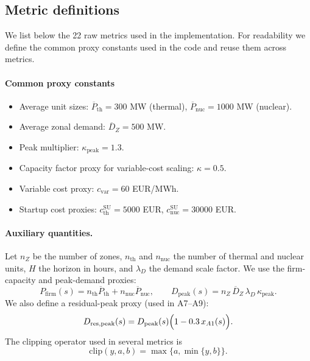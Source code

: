 \documentclass{article}
\begin{document}
\subsection{Metric definitions}
\label{app:crit_metrics}

We list below the 22 raw metrics used in the implementation. For readability we define the common proxy constants used in the code and reuse them across metrics.

\paragraph{Common proxy constants}
\begin{itemize}[noitemsep]
\item Average unit sizes: $\overline{P}_{\mathrm{th}}=300$ MW (thermal), $\overline{P}_{\mathrm{nuc}}=1000$ MW (nuclear).
\item Average zonal demand: $\overline{D}_Z=500$ MW.
\item Peak multiplier: $\kappa_{\mathrm{peak}}=1.3$.
\item Capacity factor proxy for variable-cost scaling: $\kappa=0.5$.
\item Variable cost proxy: $c_{\mathrm{var}}=60$ EUR/MWh.
\item Startup cost proxies: $c^{\mathrm{SU}}_{\mathrm{th}}=5000$ EUR, $c^{\mathrm{SU}}_{\mathrm{nuc}}=30000$ EUR.
\end{itemize}

\paragraph{Auxiliary quantities.}
Let $n_Z$ be the number of zones, $n_{\mathrm{th}}$ and $n_{\mathrm{nuc}}$ the number of thermal and nuclear units, $H$ the horizon in hours, and $\lambda_D$ the demand scale factor.
We use the firm-capacity and peak-demand proxies:
\begin{equation}
P_{\mathrm{firm}}(s)=n_{\mathrm{th}}\overline{P}_{\mathrm{th}}+n_{\mathrm{nuc}}\overline{P}_{\mathrm{nuc}},
\qquad
D_{\mathrm{peak}}(s)=n_Z\,\overline{D}_Z\,\lambda_D\,\kappa_{\mathrm{peak}}.
\label{eq:aux_peak_firm}
\end{equation}
We also define a residual-peak proxy (used in A7--A9):
\begin{equation}
D_{\mathrm{res,peak}}(s)=D_{\mathrm{peak}}(s)\Bigl(1-0.3\,x_{A1}(s)\Bigr).
\label{eq:aux_respeak}
\end{equation}
The clipping operator used in several metrics is
\begin{equation}
\mathrm{clip}(y,a,b)=\max\{a,\min\{y,b\}\}.
\label{eq:clip}
\end{equation}
\end{document}
